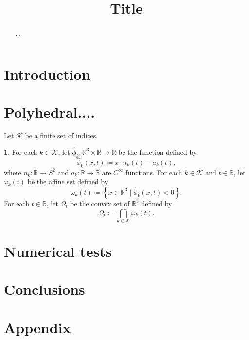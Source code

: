 \documentclass[english]{article}
\theoremstyle{plain}
\theoremstyle{definition}
\newtheorem{defn}[thm]{\protect\definitionname}
\theoremstyle{plain}
\theoremstyle{plain}
\theoremstyle{plain}
\theoremstyle{definition}
\theoremstyle{remark}
\theoremstyle{plain}
\providecommand{\definitionname}{Definition}
\begin{document}
\title{Title}
\maketitle
\begin{abstract}
...
\end{abstract}

\section{Introduction}

\section{Polyhedral....}

Let $\mathcal{K}$ be a finite set of indices.
\begin{defn}
	For each $k\in\mathcal{K}$, let $\widehat{\phi}_{k}:\mathbb{R}^{3}\times\mathbb{R}\rightarrow\mathbb{R}$
	be the function defined by
	\[
	\widehat{\phi}_{k}\left(x,t\right)\coloneqq x\cdot n_{k}\left(t\right)-a_{k}\left(t\right),
	\]
	where $n_{k}:\mathbb{R}\rightarrow S^{2}$ and $a_{k}:\mathbb{R}\rightarrow\mathbb{R}$
	are $C^{\infty}$ functions. For each $k\in\mathcal{K}$ and $t\in\mathbb{R}$,
	let $\omega_{k}\left(t\right)$ be the affine set defined by
	\[
	\omega_{k}\left(t\right)\coloneqq\left\{ x\in\mathbb{R}^{3}\mid\widehat{\phi}_{k}\left(x,t\right)<0\right\} .
	\]
	For each $t\in\mathbb{R}$, let $\Omega_{t}$ be the convex set of
	$\mathbb{R}^{3}$ defined by
	\[
	\Omega_{t}\coloneqq\bigcap_{k\in\mathcal{K}}\omega_{k}\left(t\right).
	\]
\end{defn}


\section{Numerical tests}

\section{Conclusions}





\section*{Appendix}
\end{document}
